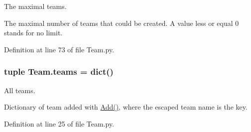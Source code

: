 The maximal teams. 

The maximal number of teams that could be created. A value less or equal 0 stands for no limit. 

Definition at line 73 of file Team.py.

\hypertarget{namespace_team_a6e402bba79c6732149986dc7571493f2}{
\subsubsection[{teams}]{\setlength{\rightskip}{0pt plus 5cm}tuple {\bf Team.teams} = dict()}}
\label{namespace_team_a6e402bba79c6732149986dc7571493f2}


All teams. 

Dictionary of team added with \hyperlink{namespace_team_ae156f7420c5c0c650a78e5eea3880645}{Add()}, where the escaped team name is the key. 

Definition at line 25 of file Team.py.

